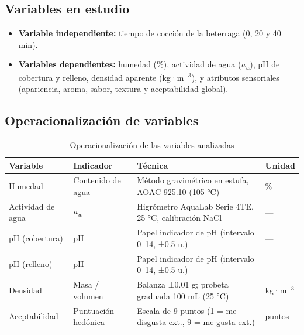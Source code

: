 \documentclass[manuscript,screen,review]{acmart}
\begin{document}
    
    \subsection{Variables en estudio}
    \begin{itemize}
      \item \textbf{Variable independiente:} tiempo de cocción de la beterraga (0, 20 y 40 min).
      \item \textbf{Variables dependientes:} humedad (\%), actividad de agua (\textit{a\textsubscript{w}}), pH de cobertura y relleno, densidad aparente (kg·m\(^{-3}\)), y atributos sensoriales (apariencia, aroma, sabor, textura y aceptabilidad global).
    \end{itemize}
    
\subsection{Operacionalización de variables}
\begin{table}[htbp]
  \centering
  \caption{Operacionalización de las variables analizadas}
  \begin{tabular}{@{} llll @{}}
    \toprule
    \textbf{Variable} & \textbf{Indicador} & \textbf{Técnica} & \textbf{Unidad} \\
    \midrule
    Humedad           & Contenido de agua                    & Método gravimétrico en estufa, AOAC 925.10 (105 °C) & \% \\
    Actividad de agua & \textit{a\textsubscript{w}}          & Higrómetro AquaLab Serie 4TE, 25 °C, calibración NaCl & — \\
    pH (cobertura)    & pH                                   & Papel indicador de pH (intervalo 0–14, ±0.5 u.)      & — \\
    pH (relleno)      & pH                                   & Papel indicador de pH (intervalo 0–14, ±0.5 u.)      & — \\
    Densidad          & Masa / volumen                       & Balanza ±0.01 g; probeta graduada 100 mL (25 °C)      & kg·m\(^{-3}\) \\
    Aceptabilidad     & Puntuación hedónica                  & Escala de 9 puntos (1 = me disgusta ext., 9 = me gusta ext.) & puntos \\
    \bottomrule
  \end{tabular}
\end{table}
\end{document}

